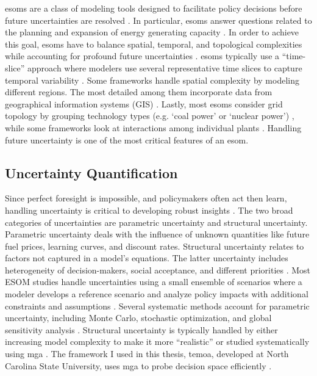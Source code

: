 \glspl{esom} are a class of modeling tools designed to facilitate policy decisions before
future uncertainties are resolved \cite{hunter_modeling_2013}. In particular, \glspl{esom} answer questions
related to the planning and expansion of energy generating capacity \cite{de_queiroz_repurposing_2019}.
In order to achieve this goal, \glspl{esom} have to balance spatial, temporal, and topological
complexities while accounting for profound future uncertainties \cite{martinez-gordon_review_2021}.
\glspl{esom} typically use a “time-slice” approach where modelers use several
representative time slices to capture temporal variability \cite{fattahi_systemic_2020}.
Some frameworks handle spatial complexity by modeling different regions. The most detailed among
them incorporate data from geographical information systems (GIS) \cite{fattahi_systemic_2020}.
Lastly, most \glspl{esom} consider grid topology by grouping technology types (e.g. ‘coal power’
or ‘nuclear power’) \cite{fattahi_systemic_2020}, while some frameworks look at
interactions among individual plants \cite{jenkins_enhanced_2017}. Handling
future uncertainty is one of the most critical features of an \gls{esom}.

\subsection{Uncertainty Quantification}

Since perfect foresight is impossible, and policymakers often act then learn, handling
uncertainty is critical to developing robust insights
\cite{yue_review_2018, decarolis_modelling_2016}.
The two broad categories of uncertainties are parametric uncertainty and structural
uncertainty. Parametric uncertainty deals with the influence of unknown quantities
like future fuel prices, learning curves, and discount rates. Structural uncertainty
relates to factors not captured in a model’s equations\cite{hunter_modeling_2013,
yue_review_2018}. The latter uncertainty includes heterogeneity of decision-makers,
social acceptance, and different priorities \cite{yue_review_2018}. Most ESOM
studies handle uncertainties using a small ensemble of scenarios where a modeler
develops a  reference scenario and analyze policy impacts with additional constraints
and assumptions \cite{yue_review_2018}.  Several systematic methods account for
parametric uncertainty, including Monte Carlo, stochastic optimization, and
global sensitivity analysis \cite{yue_review_2018}. Structural uncertainty
is typically handled by either increasing model complexity to make it more
``realistic'' or studied systematically using \gls{mga}
\cite{hunter_modeling_2013,decarolis_modelling_2016, yue_review_2018}.
The framework I used in this thesis, \gls{temoa}, developed at North Carolina
State University, uses \gls{mga} to probe decision space efficiently
\cite{decarolis_temoa_2010}.


